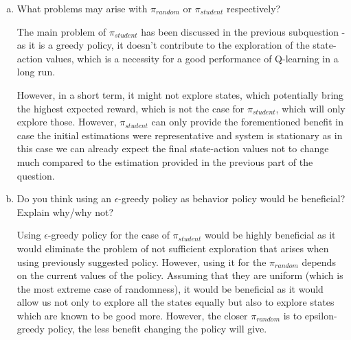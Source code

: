 \documentclass{exam}
\begin{document}
\begin{problem}
\begin{enumerate}
\begin{enumerate}[(a)]
\begin{solutionorlines}[2in]
        \end{solutionorlines}
        \item What problems may arise with $\pi_{random}$ or $\pi_{student}$ respectively?
        \begin{solutionorlines}[2in]
        The main problem of $\pi_{student}$ has been discussed in the previous subquestion - as it is a greedy policy, it doesn't contribute to the exploration of the state-action values, which is a necessity for a good performance of Q-learning in a long run. 
        
        However, in a short term, it might not explore states, which potentially bring the highest expected reward, which is not the case for $\pi_{student}$, which will only explore those. However, $\pi_{student}$ can only provide the forementioned benefit in case the initial estimations were representative and system is stationary as in this case we can already expect the final state-action values not to change much compared to the estimation provided in the previous part of the question.
        \end{solutionorlines}
        \item Do you think using an $\epsilon$-greedy policy as behavior policy would be beneﬁcial? Explain why/why not?
        \begin{solutionorlines}[2in]
        Using $\epsilon$-greedy policy for the case of $\pi_{student}$ would be highly beneficial as it would eliminate the problem of not sufficient exploration that arises when using previously suggested policy. However, using it for the $\pi_{random}$ depends on the current values of the policy. Assuming that they are uniform (which is the most extreme case of randomness), it would be beneficial as it would allow us not only to explore all the states equally but also to explore states which are known to be good more. However, the closer $\pi_{random}$ is to epsilon-greedy policy, the less benefit changing the policy will give.
        \end{solutionorlines}
    \end{enumerate}
\end{enumerate}
\end{problem}



\end{document}
